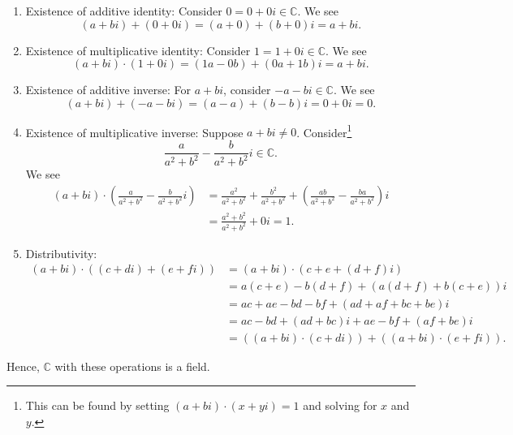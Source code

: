 \begin{sltn}[\ref{exer:cfield}]
\begin{enumerate}
    \item Existence of additive identity: Consider $ 0=0+0i\in\mathbb{C} $. We see
    \begin{equation*}
        (a+bi)+(0+0i)=(a+0)+(b+0)i=a+bi.
    \end{equation*}

    \item Existence of multiplicative identity: Consider $ 1=1+0i\in\mathbb{C} $. We see
    \begin{equation*}
        (a+bi)\cdot(1+0i)=(1a-0b)+(0a+1b)i=a+bi.
    \end{equation*}

    \item Existence of additive inverse: For $ a+bi $, consider $ -a-bi\in\mathbb{C} $. We see
    \begin{equation*}
        (a+bi)+(-a-bi)=(a-a)+(b-b)i=0+0i=0.
    \end{equation*}

    \item Existence of multiplicative inverse: Suppose $ a+bi\neq 0 $. Consider\footnote{This can be found by setting $ (a+bi)\cdot(x+y i)=1 $ and solving for $ x $ and $ y $.}
    \begin{equation*}
        \frac{a}{a^2+b^2}-\frac{b}{a^2+b^2}i\in\mathbb{C}.
    \end{equation*}
    We see
    \begin{align*}
        (a+bi)\cdot\left(\frac{a}{a^2+b^2}-\frac{b}{a^2+b^2}i\right) &= \frac{a^2}{a^2+b^2}+\frac{b^2}{a^2+b^2}+\left(\frac{ab}{a^2+b^2}-\frac{ba}{a^2+b^2}\right)i \\
        &= \frac{a^2+b^2}{a^2+b^2}+0i=1.
    \end{align*}

    \item Distributivity:
    \begin{align*}
        (a+bi)\cdot((c+di)+(e+fi)) &= (a+bi)\cdot(c+e+(d+f)i) \\
        &= a(c+e)-b(d+f)+(a(d+f)+b(c+e))i \\
        &= ac+ae-bd-bf+(ad+af+bc+be)i \\
        &= ac-bd+(ad+bc)i+ae-bf+(af+be)i \\
        &= ((a+bi)\cdot(c+di))+((a+bi)\cdot(e+fi)).
    \end{align*}
\end{enumerate}
Hence, $ \mathbb{C} $ with these operations is a field.
\end{sltn}

